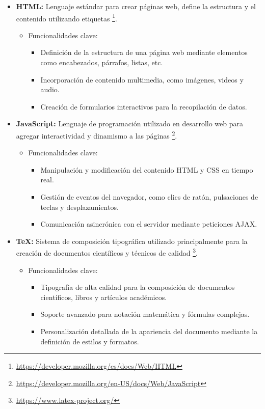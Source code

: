 \documentclass[a4paper, 12pt]{book}
\begin{document}
\begin{itemize}
  \item \textbf{HTML:} Lenguaje estándar para crear páginas web, define la estructura y el contenido utilizando etiquetas
  \footnote{\url{https://developer.mozilla.org/es/docs/Web/HTML}}.
    \begin{itemize}
        \item Funcionalidades clave:
        \begin{itemize}
            \item Definición de la estructura de una página web mediante elementos como encabezados, párrafos, listas, etc.
            \item Incorporación de contenido multimedia, como imágenes, videos y audio.
            \item Creación de formularios interactivos para la recopilación de datos.
        \end{itemize}
    \end{itemize}
  
  \item \textbf{JavaScript:} Lenguaje de programación utilizado en desarrollo web para agregar interactividad y dinamismo a las páginas
  \footnote{\url{https://developer.mozilla.org/en-US/docs/Web/JavaScript}}.
    \begin{itemize}
        \item Funcionalidades clave:
        \begin{itemize}
            \item Manipulación y modificación del contenido HTML y CSS en tiempo real.
            \item Gestión de eventos del navegador, como clics de ratón, pulsaciones de teclas y desplazamientos.
            \item Comunicación asincrónica con el servidor mediante peticiones AJAX.
        \end{itemize}
    \end{itemize}
  
  \item \textbf{TeX:} Sistema de composición tipográfica utilizado principalmente para la creación de documentos científicos y técnicos de calidad
  \footnote{\url{https://www.latex-project.org/}}.
    \begin{itemize}
        \item Funcionalidades clave:
        \begin{itemize}
            \item Tipografía de alta calidad para la composición de documentos científicos, libros y artículos académicos.
            \item Soporte avanzado para notación matemática y fórmulas complejas.
            \item Personalización detallada de la apariencia del documento mediante la definición de estilos y formatos.
        \end{itemize}
    \end{itemize}
\end{itemize}
\end{document}
